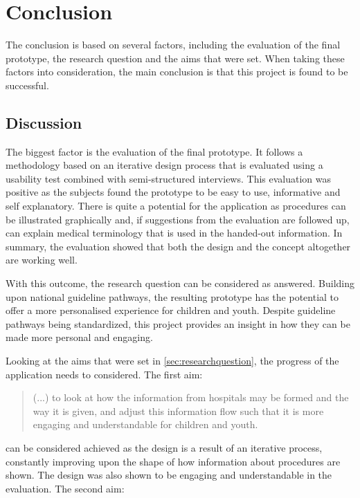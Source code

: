 \chapter{Conclusion}
\label{ch:conclusion}

The conclusion is based on several factors, including the evaluation of the final prototype, the research question and the aims that were set. When taking these factors into consideration, the main conclusion is that this project is found to be successful.

\section{Discussion}
\label{sec:discussion}

The biggest factor is the evaluation of the final prototype. It follows a methodology based on an iterative design process that is evaluated using a usability test combined with semi-structured interviews. This evaluation was positive as the subjects found the prototype to be easy to use, informative and self explanatory. There is quite a potential for the application as procedures can be illustrated graphically and, if suggestions from the evaluation are followed up, can explain medical terminology that is used in the handed-out information. In summary, the evaluation showed that both the design and the concept altogether are working well.

With this outcome, the research question can be considered as answered. Building upon national guideline pathways, the resulting prototype has the potential to offer a more personalised experience for children and youth. Despite guideline pathways being standardized, this project provides an insight in how they can be made more personal and engaging.

Looking at the aims that were set in \autoref{sec:researchquestion}, the progress of the application needs to considered. The first aim:

\begin{quote}
    (...) to look at how the information from hospitals may be formed and the way it is given, and adjust this information flow such that it is more engaging and understandable for children and youth.
\end{quote}

can be considered achieved as the design is a result of an iterative process, constantly improving upon the shape of how information about procedures are shown. The design was also shown to be engaging and understandable in the evaluation. The second aim:

